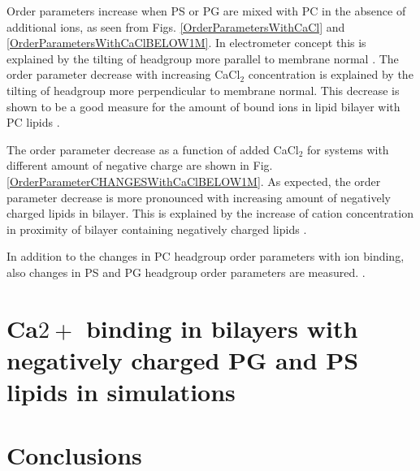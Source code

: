 \documentclass[aps,prl,superscriptaddress,twocolumn]{revtex4}
\begin{document}
Order parameters increase when PS or PG are mixed with PC 
in the absence of additional ions, as seen from Figs. 
\ref{OrderParametersWithCaCl} and \ref{OrderParametersWithCaClBELOW1M}.
In electrometer concept this is explained by the tilting of
headgroup more parallel to membrane normal \cite{??}.
The order parameter decrease with increasing CaCl$_2$ concentration 
is explained by the tilting of headgroup more perpendicular
to membrane normal. This decrease is shown to be a good measure
for the amount of bound ions in lipid bilayer with PC lipids \cite{??,catte16}.

The order parameter decrease as a function of added CaCl$_2$
for systems with different amount of negative charge are shown 
in Fig. \ref{OrderParameterCHANGESWithCaClBELOW1M}.
As expected, the order parameter decrease is more 
pronounced with increasing amount of negatively charged lipids in
bilayer. This is explained by the increase of cation concentration
in proximity of bilayer containing negatively charged lipids \cite{??}.

In addition to the changes in PC headgroup order parameters with 
ion binding, also changes in PS and PG headgroup order parameters
are measured.
.

\section{Ca$2+$ binding in bilayers with negatively charged PG and PS lipids in simulations}


\section{Conclusions}

%
\end{document}
